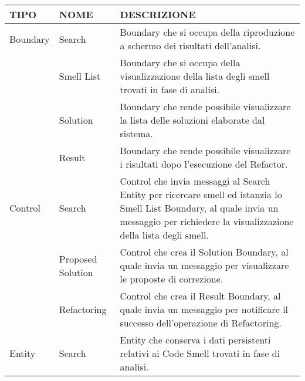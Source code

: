 

			\begin{tabular} {|l|p{3.5cm}|p{11cm}|}
					\hline \textbf{TIPO} & \textbf{NOME} & \textbf{DESCRIZIONE} \\ \hline
					Boundary & Search & Boundary che si occupa della riproduzione a schermo dei risultati dell'analisi. \\ 
					& Smell List & Boundary che si occupa della visualizzazione della lista degli smell trovati in fase di analisi. \\
					& Solution & Boundary che rende possibile visualizzare la lista delle soluzioni elaborate dal sistema. \\ 
					& Result & Boundary che rende possibile visualizzare i risultati dopo l'esecuzione del Refactor. \\ \hline
					Control & Search & Control che invia messaggi al Search Entity per ricercare smell ed istanzia lo Smell List Boundary, al quale invia un messaggio per richiedere la visualizzazione della lista degli smell.\\ 
					& Proposed Solution & Control che crea il Solution Boundary, al quale invia un messaggio per visualizzare le proposte di correzione. \\
					& Refactoring & Control che crea il Result Boundary, al quale invia un messaggio per notificare il successo dell'operazione di Refactoring. \\ \hline 
					Entity & Search & Entity che conserva i dati persistenti relativi ai Code Smell trovati in fase di analisi. \\ \hline
			\end{tabular}
